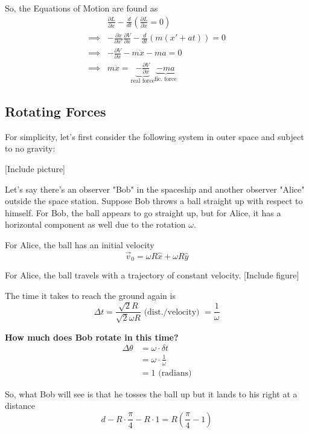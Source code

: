 \documentclass[11pt]{article}
\begin{document}
So, the Equations of Motion are found as 
\begin{align*}
  &\frac{\partial L}{\partial x} - \frac{d}{dt} \left( \frac{\partial L}{\partial \dot{x}} = 0 \right) \\
  \implies& -\frac{\partial x}{\partial x'} \frac{\partial V}{\partial x} - \frac{d}{dt} \left(m\left(x' + at\right)\right) = 0\\
  \implies& -\frac{\partial V}{\partial x} - m\ddot{x} - ma = 0 \\
  \implies& m\ddot{x} = \underbrace{- \frac{\partial V}{\partial x} }_{\text{real force}} \underbrace{- ma}_{\text{fic. force}}
\end{align*}

\vskip 0.5cm
\subsection{Rotating Forces}

For simplicity, let's first consider the following system in outer space and subject to no gravity:

\vskip 0.5cm
[Include picture]
\vskip 0.5cm

Let's say there's an observer "Bob" in the spaceship and another observer "Alice" outside the space station. Suppose Bob throws a ball straight up with respect to himself. For Bob, the ball appears to go straight up, but for Alice, it has a horizontal component as well due to the rotation $\omega$.

\vskip 0.5cm
For Alice, the ball has an initial velocity 
\[ \vec{v}_0 = \omega R \hat{x} + \omega R \hat{y} \]

For Alice, the ball travels with a trajectory of constant velocity.
\vskip 0.5cm
[Include figure]
\vskip 0.5cm

The time it takes to reach the ground again is 
\[ \Delta t = \frac{\sqrt{2} R }{\sqrt{2} \omega R } \text{ (dist./velocity) }= \frac{1}{\omega} \]

\vskip 0.5cm
\textbf{How much does Bob rotate in this time? }
\begin{align*}
  \Delta \theta &= \omega \cdot \delta t \\
  &= \omega \cdot \frac{1}{\omega} \\
  &= 1 \text{ (radians)}
\end{align*}

So, what Bob will see is that he tosses the ball up but it lands to his right at a distance 
\[ d - R \cdot \frac{\pi}{4} - R \cdot 1 = R\left(\frac{\pi}{4} - 1\right) \]
\end{document}
